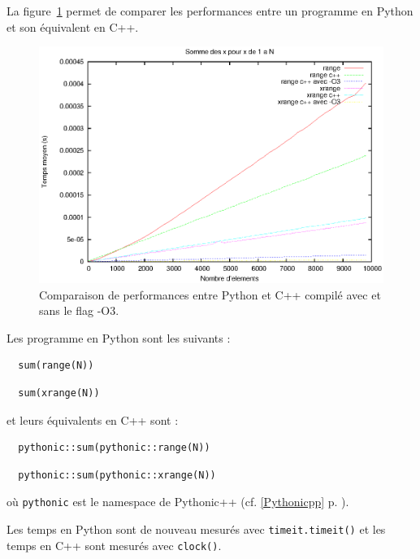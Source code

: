 \documentclass[a4paper]{article}
\begin{document}
La figure~\ref{RangeXrangePyCpp} permet de comparer les performances
entre un programme en Python et son équivalent en C++.

\begin{figure}[h]
  \includegraphics[width=\textwidth]{./Pictures/RangeXrangePyCpp}
  \caption{Comparaison de performances entre Python et C++ compilé
    avec et sans le flag -O3.}
  \label{RangeXrangePyCpp}
\end{figure}

Les programme en Python sont les suivants :

\begin{lstlisting}
  sum(range(N))
\end{lstlisting}

\begin{lstlisting}
  sum(xrange(N))
\end{lstlisting}

et leurs équivalents en C++ sont :

\begin{lstlisting}
  pythonic::sum(pythonic::range(N))
\end{lstlisting}

\begin{lstlisting}
  pythonic::sum(pythonic::xrange(N))
\end{lstlisting}

où \texttt{pythonic} est le namespace de Pythonic++ (cf. \ref{Pythonicpp}
p. \pageref{Pythonicpp}).

Les temps en Python sont de nouveau mesurés avec \texttt{timeit.timeit()} et
les temps en C++ sont mesurés avec \texttt{clock()}.
\end{document}
